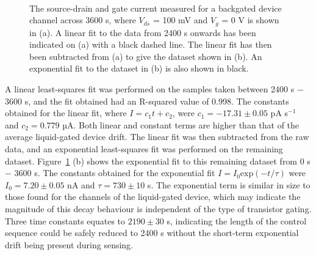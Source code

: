 \documentclass[
  a4paper,
]{scrbook}
\begin{document}
\begin{figure}
\begin{minipage}[t]{0.70\linewidth}
{{}

}

\end{minipage}%
%
\begin{minipage}[t]{0.15\linewidth}

{\centering 

~

}

\end{minipage}%

\caption[The source-drain and gate current measured for a backgated
device channel across 3600 s, with a linear curve fitted to the data,
alongside a figure showing the current data with linear fit subtracted
and an exponential curve fitted.]{\label{fig-bg-baseline-drift}The
source-drain and gate current measured for a backgated device channel
across 3600 s, where \(V_{ds}\) = 100 mV and \(V_g\) = 0 V is shown in
(a). A linear fit to the data from 2400 s onwards has been indicated on
(a) with a black dashed line. The linear fit has then been subtracted
from (a) to give the dataset shown in (b). An exponential fit to the
dataset in (b) is also shown in black.}

\end{figure}

A linear least-squares fit was performed on the samples taken between
2400 s \(-\) 3600 s, and the fit obtained had an R-squared value of
0.998. The constants obtained for the linear fit, where
\(I = c_1t + c_2\), were \(c_1 = -17.31 \pm 0.05\) pA s\(^{-1}\) and
\(c_2 = 0.779\) µA. Both linear and constant terms are higher than that
of the average liquid-gated device drift. The linear fit was then
subtracted from the raw data, and an exponential least-squares fit was
performed on the remaining dataset. Figure~\ref{fig-bg-baseline-drift}
(b) shows the exponential fit to this remaining dataset from 0 s \(-\)
3600 s. The constants obtained for the exponential fit
\(I = I_0 \textrm{exp}(-t/\tau)\) were \(I_0 = 7.20 \pm 0.05\) nA and
\(\tau = 730 \pm 10\) s. The exponential term is similar in size to
those found for the channels of the liquid-gated device, which may
indicate the magnitude of this decay behaviour is independent of the
type of transistor gating. Three time constants equates to
\(2190 \pm 30\) s, indicating the length of the control sequence could
be safely reduced to 2400 s without the short-term exponential drift
being present during sensing.
\end{document}
